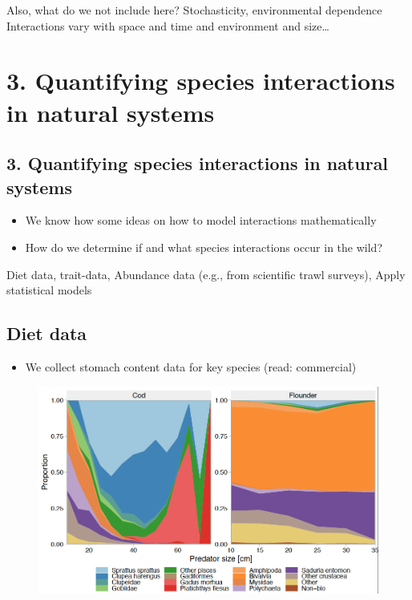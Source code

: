 \documentclass[
  letterpaper,
  DIV=11,
  numbers=noendperiod]{scrartcl}
\providecommand{\tightlist}{%
  \setlength{\itemsep}{0pt}\setlength{\parskip}{0pt}}\usepackage{longtable,booktabs,array}
\begin{document}
Also, what do we not include here? Stochasticity, environmental
dependence Interactions vary with space and time and environment and
size\ldots{}

\hypertarget{quantifying-species-interactions-in-natural-systems}{%
\section{3. Quantifying species interactions in natural
systems}\label{quantifying-species-interactions-in-natural-systems}}

\hypertarget{quantifying-species-interactions-in-natural-systems-1}{%
\subsection{3. Quantifying species interactions in natural
systems}\label{quantifying-species-interactions-in-natural-systems-1}}

\begin{itemize}
\item
  We know how some ideas on how to model interactions mathematically
\item
  How do we determine if and what species interactions occur in the
  wild?
\end{itemize}

Diet data, trait-data, Abundance data (e.g., from scientific trawl
surveys), Apply statistical models

\hypertarget{diet-data}{%
\subsection{Diet data}\label{diet-data}}

\begin{itemize}
\tightlist
\item
  We collect stomach content data for key species (read: commercial)
\end{itemize}

\begin{figure}

{\centering \includegraphics{images/diet.png}

}

\end{figure}
\end{document}
